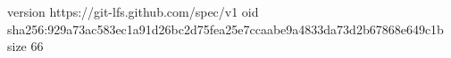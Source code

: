version https://git-lfs.github.com/spec/v1
oid sha256:929a73ac583ec1a91d26bc2d75fea25e7ccaabe9a4833da73d2b67868e649c1b
size 66

